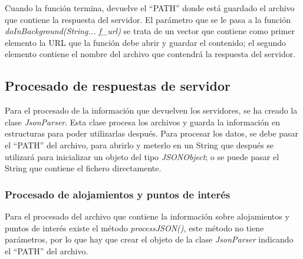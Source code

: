 Cuando la función termina, devuelve el \enquote{PATH} donde está guardado el archivo que contiene la respuesta del servidor. El parámetro que se le pasa a la función \textit{doInBackground(String... f\_url)} se trata de un vector que contiene como primer elemento la URL que la función debe abrir y guardar el contenido; el segundo elemento contiene el nombre del archivo que contendrá la respuesta del servidor.
\subsection{Procesado de respuestas de servidor}
Para el procesado de la información que devuelven los servidores, se ha creado la clase \textit{JsonParser}. Esta clase procesa los archivos y guarda la información en estructuras para poder utilizarlas después. Para procesar los datos, se debe pasar el \enquote{PATH} del archivo, para abrirlo y meterlo en un String que después se utilizará para inicializar un objeto del tipo \textit{JSONObject}; o se puede pasar el String que contiene el fichero directamente.
\subsubsection{Procesado de alojamientos y puntos de interés}
Para el procesado del archivo que contiene la información sobre alojamientos y puntos de interés existe el método \textit{processJSON()}, este método no tiene parámetros, por lo que hay que crear el objeto de la clase \textit{JsonParser} indicando el \enquote{PATH} del archivo.\newline


